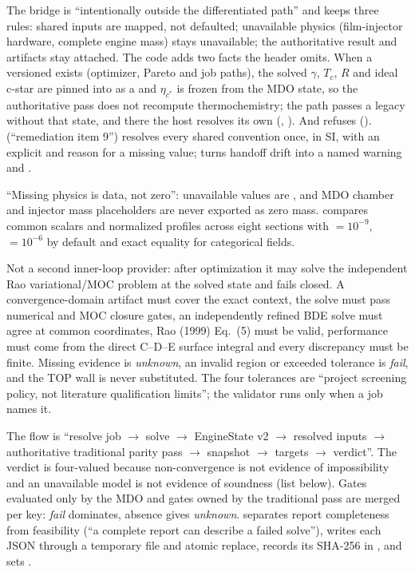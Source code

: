 The bridge is ``intentionally outside the differentiated path'' and keeps three rules: shared inputs are mapped, not defaulted; unavailable physics (film-injector hardware, complete engine mass) stays unavailable; the authoritative result and artifacts stay attached. The code adds two facts the header omits. When a versioned  exists (optimizer, Pareto and job paths), the solved $\gamma$, $T_c$, $R$ and ideal c-star are pinned into  as a  and $\eta_{c^*}$ is frozen from the MDO state, so the authoritative pass does not recompute thermochemistry; the  path passes a legacy  without that state, and there the host resolves its own (, ). And  refuses  ().  (``remediation item 9'') resolves every shared convention once, in SI, with an explicit  and reason for a missing value;  turns handoff drift into a named warning and .

``Missing physics is data, not zero'': unavailable values are , and MDO chamber and injector mass placeholders are never exported as zero mass.  compares common scalars and normalized profiles across eight sections with $=10^{-9}$, $=10^{-6}$ by default and exact equality for categorical fields.

Not a second inner-loop provider: after optimization it may solve the independent Rao variational/MOC problem at the solved state and fails closed. A convergence-domain artifact must cover the exact context, the solve must pass numerical and MOC closure gates, an independently refined BDE solve must agree at common coordinates, Rao (1999) Eq.~(5) must be valid, performance must come from the direct C--D--E surface integral and every discrepancy must be finite. Missing evidence is \emph{unknown}, an invalid region or exceeded tolerance is \emph{fail}, and the TOP wall is never substituted. The four tolerances are ``project screening policy, not literature qualification limits''; the validator runs only when a job names it.

The flow is ``resolve job $\rightarrow$ solve $\rightarrow$ EngineState v2 $\rightarrow$ resolved inputs $\rightarrow$ authoritative traditional parity pass $\rightarrow$ snapshot $\rightarrow$ targets $\rightarrow$ verdict''. The verdict is four-valued because non-convergence is not evidence of impossibility and an unavailable model is not evidence of soundness (list below). Gates evaluated only by the MDO and gates owned by the traditional pass are merged per key: \emph{fail} dominates, absence gives \emph{unknown}.  separates report completeness from feasibility (``a complete report can describe a failed solve''), writes each JSON through a temporary file and atomic replace, records its SHA-256 in , and sets .

